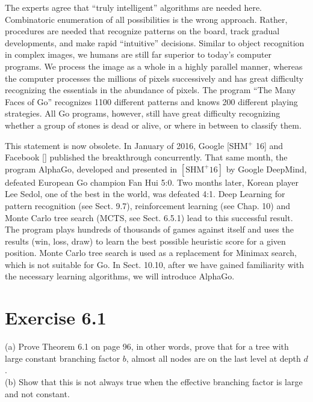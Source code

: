 \documentclass[10pt]{book}
\begin{document}
\begin{displayquote}
The experts agree that ``truly intelligent'' algorithms are needed here. Combinatoric enumeration of all possibilities is the wrong approach. Rather, procedures are needed that recognize patterns on the board, track gradual developments, and make rapid ``intuitive'' decisions. Similar to object recognition in complex images, we humans are still far superior to today's computer programs. We process the image as a whole in a highly parallel manner, whereas the computer processes the millions of pixels successively and has great difficulty recognizing the essentials in the abundance of pixels. The program ``The Many Faces of Go'' recognizes 1100 different patterns and knows 200 different playing strategies. All Go programs, however, still have great difficulty recognizing whether a group of stones is dead or alive, or where in between to classify them.
\end{displayquote}

This statement is now obsolete. In January of 2016, Google [SHM$^{+}$ 16] and Facebook [\cite{tian2016go}] published the breakthrough concurrently. That same month, the program AlphaGo, developed and presented in $\left[\mathrm{SHM}^{+} 16\right]$ by Google DeepMind, defeated European Go champion Fan Hui 5:0. Two months later, Korean player Lee Sedol, one of the best in the world, was defeated 4:1. Deep Learning for pattern recognition (see Sect. 9.7), reinforcement learning (see Chap. 10) and Monte Carlo tree search (MCTS, see Sect. 6.5.1) lead to this successful result.
The program plays hundreds of thousands of games against itself and uses the results (win, loss, draw) to learn the best possible heuristic score for a given position. Monte Carlo tree search is used as a replacement for Minimax search, which is not suitable for Go. In Sect. 10.10, after we have gained familiarity with the necessary learning algorithms, we will introduce AlphaGo.

\section{Exercise 6.1}
(a) Prove Theorem 6.1 on page 96, in other words, prove that for a tree with large constant branching factor $b$, almost all nodes are on the last level at depth $d$.\\
(b) Show that this is not always true when the effective branching factor is large and not constant.
\end{document}

